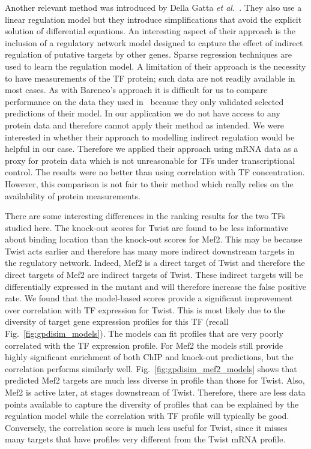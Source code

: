 \documentclass{pnastwo}
\begin{document}
\begin{article}
Another relevant method was introduced by Della Gatta {\em et
  al.}~\cite{Gatta2008}. They also use a linear regulation model but
they introduce simplifications that avoid the explicit solution of
differential equations. An interesting aspect of their approach is the
inclusion of a regulatory network model designed to capture the effect
of indirect regulation of putative targets by other genes. Sparse regression
techniques are used to learn the regulation model. A limitation of
their approach is the necessity to have measurements of the TF
protein; such data are not readily available in most cases. As with
Barenco's approach it is difficult for us to compare performance on
the data they used in~\cite{Gatta2008} because they only validated
selected predictions of their model. In our application we do not have
access to any protein data and therefore cannot apply their method as
intended. We were interested in whether
their approach to modelling indirect regulation would be helpful in
our case. Therefore we applied their approach using mRNA data as a
proxy for protein data which is not unreasonable for TFs under
transcriptional control. The results were no better than
using correlation with TF concentration. However, this comparison is
not fair to their method which really relies on the
availability of protein measurements.

There are some interesting differences in the ranking results for the two TFs studied
here. The knock-out scores for Twist are found to be less informative
about binding location than the knock-out scores for Mef2. This may be
because Twist acts earlier and therefore has many more indirect
downstream targets in the regulatory network. Indeed, Mef2 is a
direct target of Twist and therefore the direct targets of Mef2 are
indirect targets of Twist. These indirect targets will be
differentially expressed in the mutant and will therefore increase the
false positive rate. We found that the model-based scores provide 
a significant improvement over correlation with TF expression for Twist. 
This is most likely due to the diversity of target gene expression profiles
 for this TF (recall Fig.~\ref{fig:gpdisim_models}). The models can fit 
profiles that are very poorly correlated with the TF expression profile. For Mef2
the models still provide highly significant enrichment of both ChIP and knock-out 
predictions, but the correlation performs similarly well. Fig.~\ref{fig:gpdisim_mef2_models} 
shows that predicted Mef2 targets are much less diverse in profile than those for Twist. Also, Mef2 is
active later, at stages downstream of Twist. Therefore, there
are less data points available to capture the diversity of profiles
that can be explained by the regulation model while the correlation with TF profile will typically be good. Conversely, the
correlation score is much less useful for Twist, since it misses many
targets that have profiles very different from the Twist mRNA profile. 


\end{article}
\end{document}
